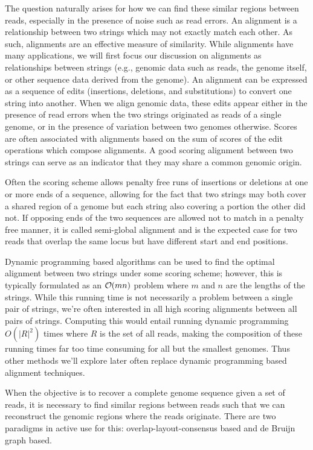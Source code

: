 The question naturally arises for how we can find these similar regions between reads, especially in the presence of noise such as read errors.
An alignment is a relationship between two strings which may not exactly match each other.  As such, alignments are an effective measure of similarity\cite{needleman1970general}.  While alignments have many applications, we will first focus our discussion on alignments as relationships between strings (e.g., genomic data such as reads, the genome itself, or other sequence data derived from the genome).
An alignment can be expressed as a sequence of edits (insertions, deletions, and substitutions) to convert one string into another.  When we align genomic data, these edits appear either in the presence of read errors when the two strings originated as reads of a single genome, or in the presence of variation between two genomes otherwise.
Scores are often associated with alignments based on the sum of scores of the edit operations which compose alignments. A good scoring alignment between two strings can serve as an indicator that they may share a common genomic origin.

Often the scoring scheme allows penalty free runs of insertions or deletions at one or more ends of a sequence, allowing for the fact that two strings may both cover a shared region of a genome but each string also covering a portion the other did not.
If opposing ends of the two sequences are allowed not to match in a penalty free manner, it is called semi-global alignment and is the expected case for two reads that overlap the same locus but have different start and end positions.

Dynamic programming based algorithms can be used to find the optimal alignment between two strings under some scoring scheme; however, this is typically formulated as an $\bigO(mn)$ problem where $m$ and $n$ are the lengths of the strings. While this running time is not necessarily a problem between a single pair of strings, we're often interested in all high scoring alignments between all pairs of strings.  Computing this would entail running dynamic programming $O(|R|^2)$ times where $R$ is the set of all reads, making the composition of these running times far too time consuming for all but the smallest genomes. Thus other methods we'll explore later often replace dynamic programming based alignment techniques.

When the objective is to recover a complete genome sequence given a set of reads, it is necessary to find similar regions between reads such that we can reconstruct the genomic regions where the reads originate.  There are two paradigms in active use for this: overlap-layout-consensus based and de Bruijn graph based.


